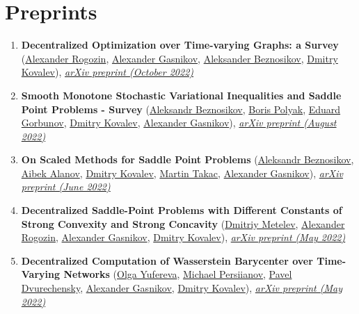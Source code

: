 \section{Preprints}
\begin{enumerate}
\item \textbf{Decentralized Optimization over Time-varying Graphs: a Survey} (\href{https://scholar.google.com/citations?user=sEjyzkgAAAAJ}{\color{linkcolour}Alexander Rogozin}, \href{https://scholar.google.ru/citations?user=AmeE8qkAAAAJ}{\color{linkcolour}Alexander Gasnikov}, \href{}{\color{linkcolour}Aleksander Beznosikov}, \href{https://www.dmitry-kovalev.com}{\color{linkcolour}Dmitry Kovalev}), \href{https://arxiv.org/abs/2210.09719}{\em \color{black}arXiv preprint (October 2022)}
\item \textbf{Smooth Monotone Stochastic Variational Inequalities and Saddle Point Problems - Survey} (\href{https://anbeznosikov.github.io}{\color{linkcolour}Aleksandr Beznosikov}, \href{https://sites.google.com/site/lab7polyak/}{\color{linkcolour}Boris Polyak}, \href{https://eduardgorbunov.github.io}{\color{linkcolour}Eduard Gorbunov}, \href{https://www.dmitry-kovalev.com}{\color{linkcolour}Dmitry Kovalev}, \href{https://scholar.google.ru/citations?user=AmeE8qkAAAAJ}{\color{linkcolour}Alexander Gasnikov}), \href{https://arxiv.org/abs/2208.13592}{\em \color{black}arXiv preprint (August 2022)}
\item \textbf{On Scaled Methods for Saddle Point Problems} (\href{https://anbeznosikov.github.io}{\color{linkcolour}Aleksandr Beznosikov}, \href{}{\color{linkcolour}Aibek Alanov}, \href{https://www.dmitry-kovalev.com}{\color{linkcolour}Dmitry Kovalev}, \href{https://mtakac.com}{\color{linkcolour}Martin Takac}, \href{https://scholar.google.ru/citations?user=AmeE8qkAAAAJ}{\color{linkcolour}Alexander Gasnikov}), \href{https://arxiv.org/abs/2206.08303}{\em \color{black}arXiv preprint (June 2022)}
\item \textbf{Decentralized Saddle-Point Problems with Different Constants of Strong Convexity and Strong Concavity} (\href{}{\color{linkcolour}Dmitriy Metelev}, \href{https://scholar.google.com/citations?user=sEjyzkgAAAAJ}{\color{linkcolour}Alexander Rogozin}, \href{https://scholar.google.ru/citations?user=AmeE8qkAAAAJ}{\color{linkcolour}Alexander Gasnikov}, \href{https://www.dmitry-kovalev.com}{\color{linkcolour}Dmitry Kovalev}), \href{https://arxiv.org/abs/2206.00090}{\em \color{black}arXiv preprint (May 2022)}
\item \textbf{Decentralized Computation of Wasserstein Barycenter over Time-Varying Networks} (\href{https://scholar.google.com/citations?user=v6tuw7IAAAAJ}{\color{linkcolour}Olga Yufereva}, \href{}{\color{linkcolour}Michael Persiianov}, \href{http://wias-berlin.de/people/dvureche/}{\color{linkcolour}Pavel Dvurechensky}, \href{https://scholar.google.ru/citations?user=AmeE8qkAAAAJ}{\color{linkcolour}Alexander Gasnikov}, \href{https://www.dmitry-kovalev.com}{\color{linkcolour}Dmitry Kovalev}), \href{https://arxiv.org/abs/2205.15669}{\em \color{black}arXiv preprint (May 2022)}

\end{enumerate}
